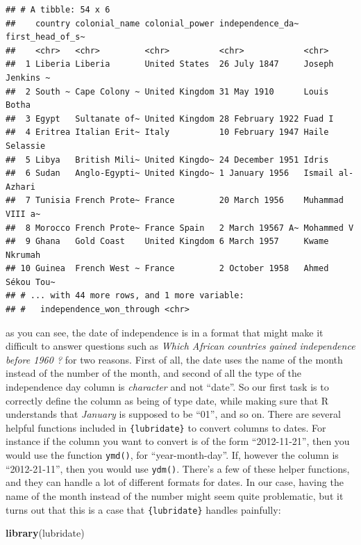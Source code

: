 \documentclass[]{gitbook}
\newenvironment{Shaded}{\begin{snugshade}}{\end{snugshade}}
\newcommand{\KeywordTok}[1]{\textcolor[rgb]{0.13,0.29,0.53}{\textbf{#1}}}
\newcommand{\NormalTok}[1]{#1}
\theoremstyle{definition}
\theoremstyle{definition}
\theoremstyle{definition}
\theoremstyle{remark}
\begin{document}
\begin{verbatim}
## # A tibble: 54 x 6
##    country colonial_name colonial_power independence_da~ first_head_of_s~
##    <chr>   <chr>         <chr>          <chr>            <chr>           
##  1 Liberia Liberia       United States  26 July 1847     Joseph Jenkins ~
##  2 South ~ Cape Colony ~ United Kingdom 31 May 1910      Louis Botha     
##  3 Egypt   Sultanate of~ United Kingdom 28 February 1922 Fuad I          
##  4 Eritrea Italian Erit~ Italy          10 February 1947 Haile Selassie  
##  5 Libya   British Mili~ United Kingdo~ 24 December 1951 Idris           
##  6 Sudan   Anglo-Egypti~ United Kingdo~ 1 January 1956   Ismail al-Azhari
##  7 Tunisia French Prote~ France         20 March 1956    Muhammad VIII a~
##  8 Morocco French Prote~ France Spain   2 March 19567 A~ Mohammed V      
##  9 Ghana   Gold Coast    United Kingdom 6 March 1957     Kwame Nkrumah   
## 10 Guinea  French West ~ France         2 October 1958   Ahmed Sékou Tou~
## # ... with 44 more rows, and 1 more variable:
## #   independence_won_through <chr>
\end{verbatim}

as you can see, the date of independence is in a format that might make
it difficult to answer questions such as \emph{Which African countries
gained independence before 1960 ?} for two reasons. First of all, the
date uses the name of the month instead of the number of the month, and
second of all the type of the independence day column is
\emph{character} and not ``date''. So our first task is to correctly
define the column as being of type date, while making sure that R
understands that \emph{January} is supposed to be ``01'', and so on.
There are several helpful functions included in \texttt{\{lubridate\}}
to convert columns to dates. For instance if the column you want to
convert is of the form ``2012-11-21'', then you would use the function
\texttt{ymd()}, for ``year-month-day''. If, however the column is
``2012-21-11'', then you would use \texttt{ydm()}. There's a few of
these helper functions, and they can handle a lot of different formats
for dates. In our case, having the name of the month instead of the
number might seem quite problematic, but it turns out that this is a
case that \texttt{\{lubridate\}} handles painfully:

\begin{Shaded}
\begin{Highlighting}[]
\KeywordTok{library}\NormalTok{(lubridate)}
\end{Highlighting}
\end{Shaded}
\end{document}
